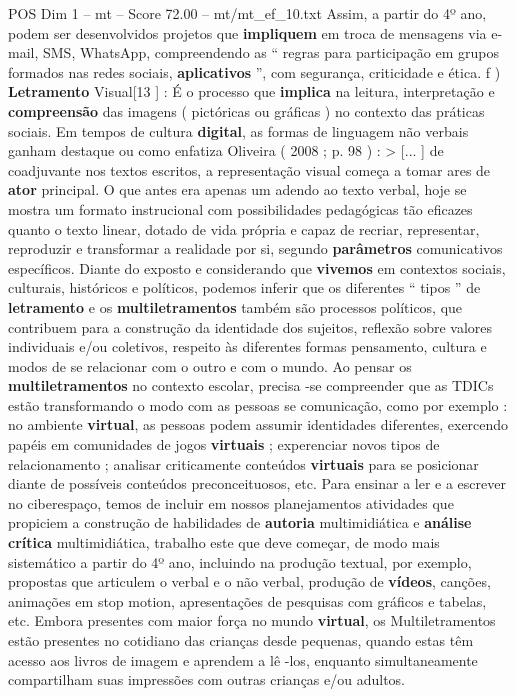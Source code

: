 \begin{textsample}{POS Dim 1 – mt – Score 72.00 – mt/mt\_ef\_10.txt}
Assim, a partir do 4º ano, podem ser desenvolvidos projetos que \textbf{impliquem} em troca de mensagens via e-mail, SMS, WhatsApp, compreendendo as “ regras para participação em grupos formados nas redes sociais, \textbf{aplicativos} ”, com segurança, criticidade e ética. f ) \textbf{Letramento} Visual[13 ] : É o processo que \textbf{implica} na leitura, interpretação e \textbf{compreensão} das imagens ( pictóricas ou gráficas ) no contexto das práticas sociais.
Em tempos de cultura \textbf{digital}, as formas de linguagem não verbais ganham destaque ou como enfatiza Oliveira ( 2008 ; p. 98 ) : > [... ] de coadjuvante nos textos escritos, a representação visual começa a tomar ares de \textbf{ator} principal.
O que antes era apenas um adendo ao texto verbal, hoje se mostra um formato instrucional com possibilidades pedagógicas tão eficazes quanto o texto linear, dotado de vida própria e capaz de recriar, representar, reproduzir e transformar a realidade por si, segundo \textbf{parâmetros} comunicativos específicos.
Diante do exposto e considerando que \textbf{vivemos} em contextos sociais, culturais, históricos e políticos, podemos inferir que os diferentes “ tipos ” de \textbf{letramento} e os \textbf{multiletramentos} também são processos políticos, que contribuem para a construção da identidade dos sujeitos, reflexão sobre valores individuais e/ou coletivos, respeito às diferentes formas pensamento, cultura e modos de se relacionar com o outro e com o mundo.
Ao pensar os \textbf{multiletramentos} no contexto escolar, precisa -se compreender que as TDICs estão transformando o modo com as pessoas se comunicação, como por exemplo : no ambiente \textbf{virtual}, as pessoas podem assumir identidades diferentes, exercendo papéis em comunidades de jogos \textbf{virtuais} ; experenciar novos tipos de relacionamento ; analisar criticamente conteúdos \textbf{virtuais} para se posicionar diante de possíveis conteúdos preconceituosos, etc.
Para ensinar a ler e a escrever no ciberespaço, temos de incluir em nossos planejamentos atividades que propiciem a construção de habilidades de \textbf{autoria} multimidiática e \textbf{análise} \textbf{crítica} multimidiática, trabalho este que deve começar, de modo mais sistemático a partir do 4º ano, incluindo na produção textual, por exemplo, propostas que articulem o verbal e o não verbal, produção de \textbf{vídeos}, canções, animações em stop motion, apresentações de pesquisas com gráficos e tabelas, etc.
Embora presentes com maior força no mundo \textbf{virtual}, os Multiletramentos estão presentes no cotidiano das crianças desde pequenas, quando estas têm acesso aos livros de imagem e aprendem a lê -los, enquanto simultaneamente compartilham suas impressões com outras crianças e/ou adultos.

\end{textsample}

